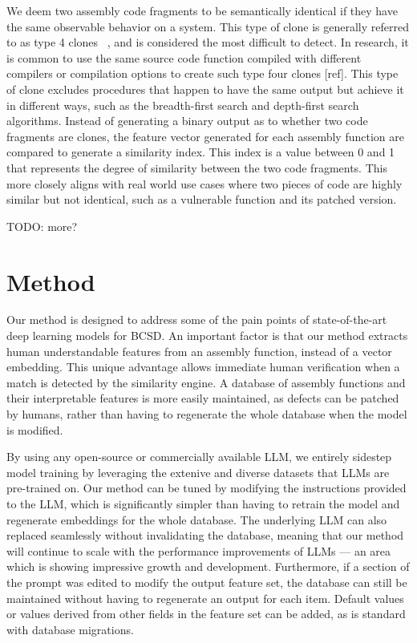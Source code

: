 \documentclass[conference,compsoc]{IEEEtran}
\begin{document}
We deem two assembly code fragments to be semantically identical if they have the same observable behavior on a system.
This type of clone is generally referred to as type 4 clones ~\cite{Asm2Vec,BinClone}, and is considered the most difficult
to detect. In research, it is common to use the same source code function compiled with different compilers or compilation
options to create such type four clones [ref]. This type of clone excludes procedures that happen to have the same output but
achieve it in different ways, such as the breadth-first search and depth-first search algorithms. Instead of generating a
binary output as to whether two code fragments are clones, the feature vector generated for each assembly function are
compared to generate a similarity index. This index is a value between 0 and 1 that represents the degree of similarity
between the two code fragments. This more closely aligns with real world use cases where two pieces of code are highly similar
but not identical, such as a vulnerable function and its patched version. 

TODO: more?

\section{Method}

Our method is designed to address some of the pain points of state-of-the-art deep learning models for BCSD.
An important factor is that our method extracts human understandable features from an assembly function, instead
of a vector embedding. This unique advantage allows immediate human verification when a match is detected by the similarity
engine. A database of assembly functions and their interpretable features is more easily maintained, as defects can
be patched by humans, rather than having to regenerate the whole database when the model is modified.

By using any open-source or commercially available LLM, we entirely sidestep model training by leveraging the extenive
and diverse datasets that LLMs are pre-trained on.  Our method can be tuned by modifying the instructions provided to
the LLM, which is significantly simpler than having to retrain the model and regenerate embeddings for the whole database.
The underlying LLM can also replaced seamlessly without invalidating the database, meaning that our method will continue
to scale with the performance improvements of LLMs --- an area which is showing impressive growth and development. Furthermore, if
a section of the prompt was edited to modify the output feature set, the database can still be maintained without
having to regenerate an output for each item. Default values or values derived from other fields in the feature set can be added,
as is standard with database migrations.
\end{document}

